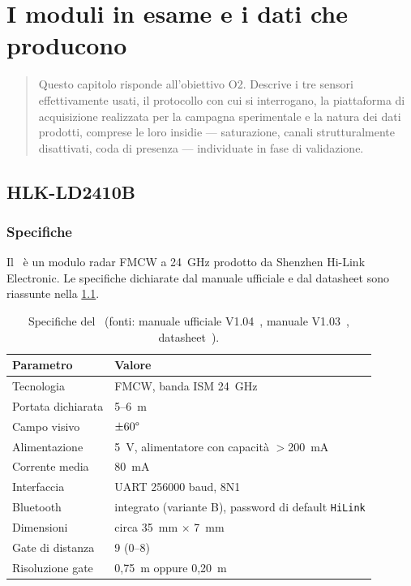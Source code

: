 \chapter{I moduli in esame e i dati che producono}
\label{cap:moduli}

\begin{quote}\small
Questo capitolo risponde all'obiettivo O2. Descrive i tre sensori effettivamente
usati, il protocollo con cui si interrogano, la piattaforma di acquisizione
realizzata per la campagna sperimentale e la natura dei dati prodotti, comprese le
loro insidie --- saturazione, canali strutturalmente disattivati, coda di presenza
--- individuate in fase di validazione.
\end{quote}

\section{HLK-LD2410B}
\label{sec:ld2410b}

\subsection{Specifiche}

Il \ldb\ è un modulo radar FMCW a 24~GHz prodotto da Shenzhen Hi-Link
Electronic. Le specifiche dichiarate dal manuale ufficiale e dal datasheet sono
riassunte nella \cref{tab:ld2410b-specs}.

\begin{table}[htbp]
\centering
\caption{Specifiche del \ldb\ (fonti: manuale ufficiale
V1.04~\cite{hilinkManualV104}, manuale V1.03~\cite{hilinkManualV103},
datasheet~\cite{ld2410bDatasheet}).}
\label{tab:ld2410b-specs}
\small
\begin{tabular}{@{}ll@{}}
\toprule
\textbf{Parametro} & \textbf{Valore} \\
\midrule
Tecnologia & FMCW, banda ISM 24~GHz \\
Portata dichiarata & 5--6~m \\
Campo visivo & $\pm 60\degree$ \\
Alimentazione & 5~V, alimentatore con capacità $>$200~mA \\
Corrente media & 80~mA \\
Interfaccia & UART 256000 baud, 8N1 \\
Bluetooth & integrato (variante B), password di default \texttt{HiLink} \\
Dimensioni & circa 35~mm $\times$ 7~mm \\
Gate di distanza & 9 (0--8) \\
Risoluzione gate & 0,75~m oppure 0,20~m \\
\bottomrule
\end{tabular}
\end{table}

